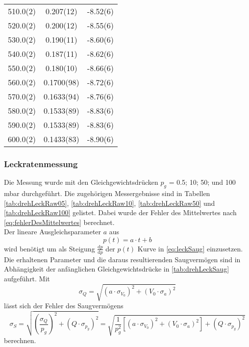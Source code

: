 \begin{longtable}{S[table-format=3.1(1)] S[table-format=3.4(4)] S[table-format=3.4(4)]}
        510.0(2) & 0.207(12) & -8.52(6) \\ 
        520.0(2) & 0.200(12) & -8.55(6) \\ 
        530.0(2) & 0.190(11) & -8.60(6) \\ 
        540.0(2) & 0.187(11) & -8.62(6) \\ 
        550.0(2) & 0.180(10) & -8.66(6) \\ 
        560.0(2) & 0.1700(98) & -8.72(6) \\ 
        570.0(2) & 0.1633(94) & -8.76(6) \\ 
        580.0(2) & 0.1533(89) & -8.83(6) \\ 
        590.0(2) & 0.1533(89) & -8.83(6) \\ 
        600.0(2) & 0.1433(83) & -8.90(6) \\      
    \end{longtable}

    \subsubsection{Leckratenmessung}
    Die Messung wurde mit den Gleichgewichtsdrücken $p_g$ = 0.5; 10; 50; und 100 \unit{\milli\bar} durchgeführt.
    Die zugehörigen Messergebnisse sind in Tabellen \ref{tab:drehLeckRaw05}, \ref{tab:drehLeckRaw10}, \ref{tab:drehLeckRaw50} und \ref{tab:drehLeckRaw100}
    gelistet. Dabei wurde der Fehler des Mittelwertes
    nach \autoref{eq:fehlerDesMittelwertes} berechnet.\\

    Der lineare Ausgleichsparameter $a$ aus
    \begin{equation*}
        p(t) = a\cdot t + b
    \end{equation*}
    wird benötigt um als Steigung $\frac{\text{d}p}{\text{d}p}$ der $p(t)$ Kurve in \autoref{eq:leckSaug} einzusetzen.
    Die erhaltenen Parameter und die daraus resultierenden Saugvermögen sind in Abhängigkeit der anfänglichen Gleichgewichtsdrücke in \autoref{tab:drehLeckSaug} aufgeführt. Mit 
    \begin{equation*}
        \sigma_Q = \sqrt{(a\cdot\sigma_{V_0})^2 + (V_0 \cdot \sigma_a)^2}
    \end{equation*}
    lässt sich der Fehler des Saugvermögens
    \begin{equation}
        \sigma_S = \sqrt{\left(\frac{\sigma_Q}{p_g}\right)^2 + (Q\cdot\sigma_{p_g})^2} = \sqrt{\frac{1}{p_g^2}\left[(a\cdot\sigma_{V_0})^2 + (V_0 \cdot \sigma_a)^2\right] + (Q\cdot\sigma_{p_g})^2}
        \label{eq:errS}
    \end{equation}
    berechnen.
    
